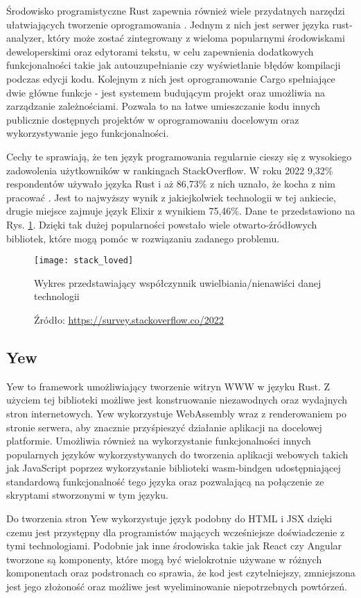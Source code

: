 Środowisko programistyczne Rust zapewnia również wiele przydatnych narzędzi
ułatwiających tworzenie oprogramowania \cite{klabnik:rust}.
Jednym z nich jest serwer języka rust-analyzer, który może zostać zintegrowany
z wieloma popularnymi środowiskami deweloperskimi oraz edytorami tekstu,
w celu zapewnienia dodatkowych funkcjonalności takie jak
autouzupełnianie czy wyświetlanie błędów kompilacji podczas edycji kodu.
Kolejnym z nich jest oprogramowanie Cargo spełniające dwie główne funkcje - 
jest systemem budującym projekt oraz umożliwia na zarządzanie zależnościami.
Pozwala to na łatwe umieszczanie kodu innych publicznie dostępnych projektów
w oprogramowaniu docelowym oraz wykorzystywanie jego funkcjonalności.

Cechy te sprawiają, że ten język programowania regularnie cieszy się z
wysokiego zadowolenia użytkowników w rankingach StackOverflow.
W roku 2022 9,32\% respondentów używało języka Rust i aż 86,73\% z nich
uznało, że kocha z nim pracować \cite{stackoverflow:popularity}.
Jest to najwyższy wynik z jakiejkolwiek technologii w tej ankiecie,
drugie miejsce zajmuje język Elixir z wynikiem 75,46\%. 
Dane te przedstawiono na Rys. \ref{stack:loved}.
Dzięki tak dużej popularności powstało wiele otwarto-źródłowych bibliotek,
które mogą pomóc w rozwiązaniu zadanego problemu.
\begin{figure}[!htb]
  \centering
  \texttt{[image: stack\_loved]}
  \caption{Wykres przedstawiający współczynnik uwielbiania/nienawiści danej technologii}
  \label{stack:loved}
  \caption*{Źródło: \url{https://survey.stackoverflow.co/2022}}
\end{figure}
\FloatBarrier

\subsection*{Yew}
Yew\cite{yew} to framework umożliwiający tworzenie witryn WWW w języku Rust.
Z użyciem tej biblioteki możliwe jest konstruowanie niezawodnych
oraz wydajnych stron internetowych. Yew wykorzystuje WebAssembly wraz
z renderowaniem po stronie serwera, aby znacznie przyśpieszyć działanie
aplikacji na docelowej platformie. Umożliwia również na wykorzystanie 
funkcjonalności innych popularnych języków wykorzystywanych do tworzenia
aplikacji webowych takich jak JavaScript poprzez wykorzystanie biblioteki
wasm-bindgen udostępniającej standardową funkcjonalność tego języka oraz
pozwalającą na połączenie ze skryptami stworzonymi w tym języku.

Do tworzenia stron Yew wykorzystuje język podobny do HTML i JSX dzięki
czemu jest przystępny dla programistów mających wcześniejsze doświadczenie
z tymi technologiami. Podobnie jak inne środowiska takie jak React czy Angular
tworzone są komponenty, które mogą być wielokrotnie używane w różnych komponentach
oraz podstronach co sprawia, że kod jest czytelniejszy, zmniejszona jest jego złożoność
oraz możliwe jest wyeliminowanie niepotrzebnych powtórzeń.

